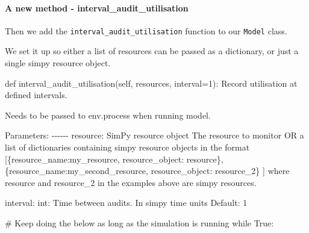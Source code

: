 \documentclass[
  letterpaper,
  DIV=11,
  numbers=noendperiod]{scrreprt}
\let\oldparagraph\paragraph
\renewcommand{\paragraph}[1]{\oldparagraph{#1}\mbox{}}
\newenvironment{Shaded}{\begin{snugshade}}{\end{snugshade}}
\newcommand{\CommentTok}[1]{\textcolor[rgb]{0.37,0.37,0.37}{#1}}
\newcommand{\ControlFlowTok}[1]{\textcolor[rgb]{0.00,0.23,0.31}{#1}}
\newcommand{\DecValTok}[1]{\textcolor[rgb]{0.68,0.00,0.00}{#1}}
\newcommand{\KeywordTok}[1]{\textcolor[rgb]{0.00,0.23,0.31}{#1}}
\newcommand{\NormalTok}[1]{\textcolor[rgb]{0.00,0.23,0.31}{#1}}
\newcommand{\OperatorTok}[1]{\textcolor[rgb]{0.37,0.37,0.37}{#1}}
\newcommand{\VariableTok}[1]{\textcolor[rgb]{0.07,0.07,0.07}{#1}}
\begin{document}
\paragraph{A new method -
interval\_audit\_utilisation}\label{a-new-method---interval_audit_utilisation}

Then we add the \texttt{interval\_audit\_utilisation} function to our
\texttt{Model} class.

We set it up so either a list of resources can be passed as a
dictionary, or just a single simpy resource object.

\begin{Shaded}
\begin{Highlighting}[]
\KeywordTok{def}\NormalTok{ interval\_audit\_utilisation(}\VariableTok{self}\NormalTok{, resources, interval}\OperatorTok{=}\DecValTok{1}\NormalTok{):}
    \CommentTok{\textquotesingle{}\textquotesingle{}\textquotesingle{}}
\CommentTok{    Record utilisation at defined intervals.}

\CommentTok{    Needs to be passed to env.process when running model.}

\CommentTok{    Parameters:}
\CommentTok{    {-}{-}{-}{-}{-}{-}}
\CommentTok{    resource: SimPy resource object}
\CommentTok{        The resource to monitor}
\CommentTok{        OR}
\CommentTok{        a list of dictionaries containing simpy resource objects in the format}
\CommentTok{        [\{\textquotesingle{}resource\_name\textquotesingle{}:\textquotesingle{}my\_resource\textquotesingle{}, \textquotesingle{}resource\_object\textquotesingle{}: resource\},}
\CommentTok{        \{\textquotesingle{}resource\_name\textquotesingle{}:\textquotesingle{}my\_second\_resource\textquotesingle{}, \textquotesingle{}resource\_object\textquotesingle{}: resource\_2\}}
\CommentTok{        ]}
\CommentTok{        where resource and resource\_2 in the examples above are simpy resources.}

\CommentTok{    interval: int:}
\CommentTok{        Time between audits.}
\CommentTok{        In simpy time units}
\CommentTok{        Default: 1}
\CommentTok{    \textquotesingle{}\textquotesingle{}\textquotesingle{}}

    \CommentTok{\# Keep doing the below as long as the simulation is running}
    \ControlFlowTok{while} \VariableTok{True}\NormalTok{:}


\end{Highlighting}
\end{Shaded}
\end{document}
